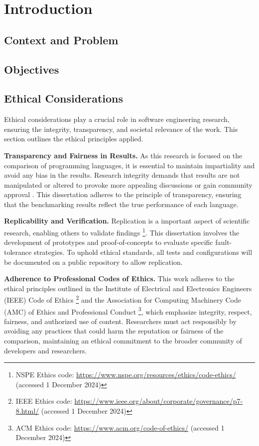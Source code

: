 % 
\chapter{Introduction} %
\label{chap:Chapter1} %


%
\section{Context and Problem} 

\section{Objectives}

\section{Ethical Considerations}

Ethical considerations play a crucial role in software engineering research, ensuring the integrity, transparency, and societal relevance of the work. This section outlines the ethical principles applied.

\textbf{Transparency and Fairness in Results.} As this research is focused on the comparison of programming languages, it is essential to maintain impartiality and avoid any bias in the results. Research integrity demands that results are not manipulated or altered to provoke more appealing discussions or gain community approval \cite{EthicDeb2018}. This dissertation adheres to the principle of transparency, ensuring that the benchmarking results reflect the true performance of each language.

\textbf{Replicability and Verification.} Replication is a important aspect of scientific research, enabling others to validate findings \footnote{NSPE Ethics code: \url{https://www.nspe.org/resources/ethics/code-ethics/} (accessed 1 December 2024)}. This dissertation involves the development of prototypes and proof-of-concepts to evaluate specific fault-tolerance strategies. To uphold ethical standards, all tests and configurations will be documented on a public repository to allow replication.

\textbf{Adherence to Professional Codes of Ethics.} This work adheres to the ethical principles outlined in the Institute of Electrical and Electronics Engineers (IEEE) Code of Ethics \footnote{IEEE Ethics code: \url{https://www.ieee.org/about/corporate/governance/p7-8.html/} (accessed 1 December 2024)} and the Association for Computing Machinery Code (AMC) of Ethics and Professional Conduct \footnote{ACM Ethics code: \url{https://www.acm.org/code-of-ethics/} (accessed 1 December 2024)}, which emphasize integrity, respect, fairness, and authorized use of content. Researchers must act responsibly by avoiding any practices that could harm the reputation or fairness of the comparison, maintaining an ethical commitment to the broader community of developers and researchers.

